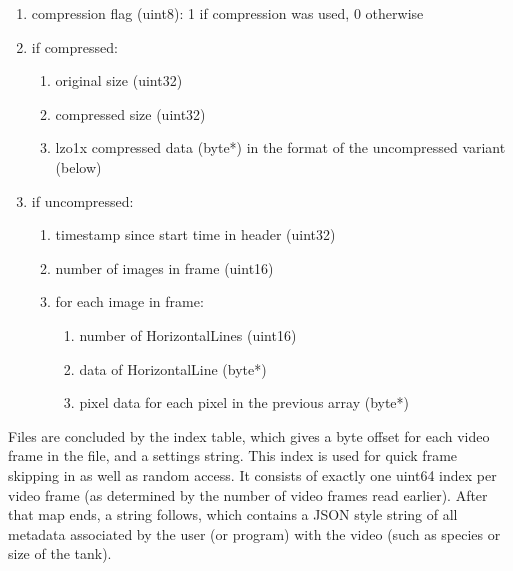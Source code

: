 \documentclass[9pt,lineno]{elife}
\newcommand{\TRex}{\protect\path{TRex}}
\begin{document}
\begin{appendixbox}
\begin{enumerate}
    \item compression flag (uint8): 1 if compression was used, 0 otherwise
    \item if compressed:
    \begin{enumerate}
        \item original size (uint32)
        \item compressed size (uint32)
        \item lzo1x compressed data (byte*) in the format of the uncompressed variant (below)
    \end{enumerate}
    \item if uncompressed:
    \begin{enumerate}
        \item timestamp since start time in header (uint32)
        \item number of images in frame (uint16)
        \item for each image in frame:
        \begin{enumerate}
            \item number of HorizontalLines (uint16)
            \item data of HorizontalLine (byte*)
            \item pixel data for each pixel in the previous array (byte*)
        \end{enumerate}
    \end{enumerate}
\end{enumerate}

Files are concluded by the index table, which gives a byte offset for each video frame in the file, and a settings string. This index is used for quick frame skipping in \TRex{} as well as random access. It consists of exactly one uint64 index per video frame (as determined by the number of video frames read earlier). After that map ends, a string follows, which contains a JSON style string of all metadata associated by the user (or program) with the video (such as species or size of the tank).

\end{appendixbox}
\end{document}
